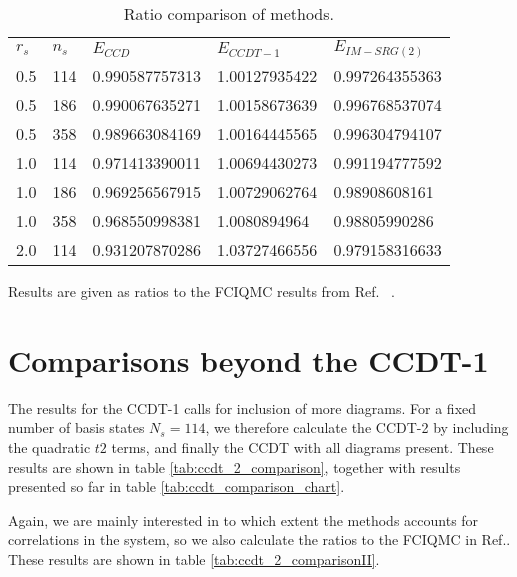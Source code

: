 \begin{table}[h]
\caption{Ratio comparison of methods.}
\begin{center}
\begin{threeparttable}
\begin{tabular}{l l l l l}
    \toprule
$r_s$ & $n_s$ & $E_{CCD}$  & $E_{CCDT-1}$ & $E_{IM-SRG(2)}$ \\
0.5 &114&0.990587757313 & 1.00127935422 & 0.997264355363 \\
0.5 &186& 0.990067635271 & 1.00158673639 & 0.996768537074 \\
0.5 &358& 0.989663084169 & 1.00164445565 & 0.996304794107 \\ \hline
1.0 &114& 0.971413390011 & 1.00694430273 & 0.991194777592 \\
1.0 &186& 0.969256567915 & 1.00729062764 & 0.98908608161 \\
1.0 &358& 0.968550998381 & 1.0080894964 & 0.98805990286 \\ \hline
2.0 &114 & 0.931207870286 & 1.03727466556 & 0.979158316633 \\
\bottomrule
\end{tabular}
\begin{tablenotes}
Results are given as ratios to the FCIQMC results from Ref.~ \cite{Shepherd2012}. 
\end{tablenotes}
\end{threeparttable}
\end{center}
\label{tab:ccdt_comparison_chartII}
\end{table}




\section{Comparisons beyond the CCDT-1}

The results for the CCDT-1 calls for inclusion of more diagrams. For a fixed number of basis states $N_s = 114$, we therefore calculate the CCDT-2 by including the quadratic $t2$ terms, and finally the CCDT with all diagrams present. These results are shown in table \ref{tab:ccdt_2_comparison}, together with results presented so far in table \ref{tab:ccdt_comparison_chart}.

Again, we are mainly interested in to which extent the methods accounts for correlations in the system, so we also calculate the ratios to the FCIQMC in Ref.\cite{Shepherd2012}. These results are shown in table \ref{tab:ccdt_2_comparisonII}. 

